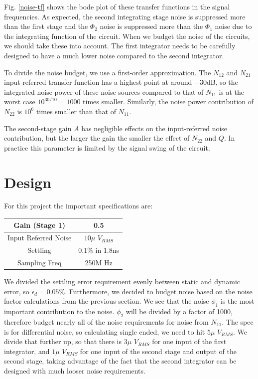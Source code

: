 \documentclass[conference]{IEEEtran}
\begin{document}
Fig. \ref{noise-tf} shows the bode plot of these transfer functions in the signal frequencies. As expected, the second integrating stage noise is suppressed more than the first stage and the $\Phi_2$ noise is suppressed more than the $\Phi_1$ noise due to the integrating function of the circuit. When we budget the noise of the circuits, we should take these into account. The first integrator needs to be carefully designed to have a much lower noise compared to the second integrator.

To divide the noise budget, we use a first-order approximation. The $N_{12}$ and $N_{21}$ input-referred transfer function has a highest point at around $-30$dB, so the integrated noise power of these noise sources compared to that of $N_{11}$ is at the worst case $10^{30/10}=1000$ times smaller. Similarly, the noise power contribution of $N_{22}$ is $10^6$ times smaller than that of $N_{11}$.

The second-stage gain $A$ has negligible effects on the input-referred noise contribution, but the larger the gain the smaller the effect of $N_{22}$ and $Q$. In practice this parameter is limited by the signal swing of the circuit.


\section{Design}
For this project the important specifications are:

\begin{center}
\begin{tabular}{|c|c|} 
\hline
Gain (Stage 1) & 0.5 \\
\hline
Input Referred Noise & $10\mu$ $V_{RMS}$ \\
\hline
Settling & 0.1\% in 1.8ns \\
\hline
Sampling Freq & 250M Hz \\
\hline
\end{tabular}
\end{center}

We divided the settling error requirement evenly between static and dynamic error, so $\epsilon_d = 0.05\%$. Furthermore, we decided to budget noise based on the noise factor calculations from the previous section. We see that the noise $\phi_1$ is the most important contribution to the noise. $\phi_2$ will be divided by a factor of 1000, therefore budget nearly all of the noise requirements for noise from $N_{11}$. The spec is for differential noise, so calculating single ended, we need to hit $5\mu$ $V_{RMS}$. We divide that further up, so that there is $3\mu$ $V_{RMS}$ for one input of the first integrator, and $1\mu$ $V_{RMS}$ for one input of the second stage and output of the second stage, taking advantage of the fact that the second integrator can be designed with much looser noise requirements.
\end{document}
